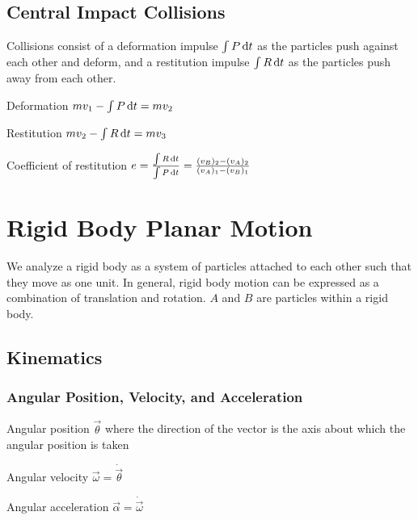 \documentclass{article}
\begin{document}
\subsection{Central Impact Collisions}
\label{sec:particle-collisions}

Collisions consist of a deformation impulse \(\int P \dif{t}\) as the particles push against each
other and deform, and a restitution impulse \(\int R \dif{t}\) as the particles push away from each
other.

\begin{description*}
\item[Deformation]
  \(mv_1 - \int P \dif{t} = mv_2\)
\item[Restitution]
  \(mv_2 - \int R \dif{t} = mv_3\)
\item[Coefficient of restitution]
  \(e = \frac{\int R \dif{t}}{\int P \dif{t}} = \frac{(v_B)_2 - (v_A)_2}{(v_A)_1 - (v_B)_1}\)
\end{description*}

\section{Rigid Body Planar Motion}
\label{sec:rigid-body-motion}

We analyze a rigid body as a system of particles attached to each other such that they move as one
unit. In general, rigid body motion can be expressed as a combination of translation and
rotation. $A$ and $B$ are particles within a rigid body.

\subsection{Kinematics}
\label{sec:rigid-body-kinematics}

\subsubsection{Angular Position, Velocity, and Acceleration}

\begin{description*}
\item[Angular position] \(\vec\theta\) where the direction of the vector is the axis about which the
  angular position is taken
\item[Angular velocity]
  \(\vec\omega = \dot{\vec\theta}\)
\item[Angular acceleration]
  \(\vec\alpha = \dot{\vec\omega}\)
\end{description*}
\end{document}
